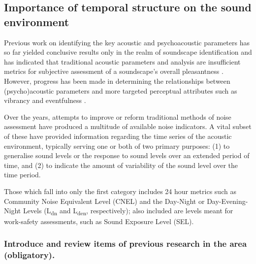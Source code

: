 \subsection{Importance of temporal structure on the sound environment}

Previous work on identifying the key acoustic and psychoacoustic parameters has so far yielded conclusive results only in the realm of soundscape identification \cite{Rychtarikova2013Soundscape} and has indicated that traditional acoustic parameters and analysis are insufficient metrics for subjective assessment of a soundscape's overall pleasantness \cite{Aletta2014Towards}. However, progress has been made in determining the relationships between (psycho)acoustic parameters and more targeted perceptual attributes such as vibrancy and eventfulness \cite{Aletta2018Towards, Jeon2011Non}.


Over the years, attempts to improve or reform traditional methods of noise assessment have produced a multitude of available noise indicators. A vital subset of these have provided information regarding the time series of the acoustic environment, typically serving one or both of two primary purposes: (1) to generalise sound levels or the response to sound levels over an extended period of time, and (2) to indicate the amount of variability of the sound level over the time period.

Those which fall into only the first category includes 24 hour metrics such as Community Noise Equivalent Level (CNEL) and the Day-Night  or Day-Evening-Night Levels (L\textsubscript{dn}
and L\textsubscript{den}, respectively); also included are levels meant for work-safety assessments, such as Sound Exposure Level (SEL).


\subsubsection{Introduce and review items of previous research in the area (obligatory).}

